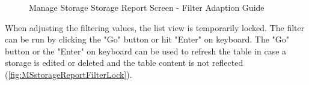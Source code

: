 \begin{figure}[htb]
	\centering
    \hspace{5pt}

    \vspace{10pt}
    \caption{Manage Storage Storage Report Screen - Filter Adaption Guide}
	\label{fig:MSstorageReportFilterAdaption}
\end{figure}

When adjusting the filtering values, the list view is temporarily locked. The filter can be run by clicking the "Go" button or hit "Enter" on keyboard. The "Go" button or the "Enter" on keyboard can be used to refresh the table in case a storage is edited or deleted and the table content is not reflected (\autoref{fig:MSstorageReportFilterLock}). 


